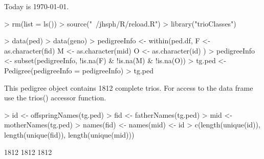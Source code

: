 \documentclass[10pt]{article}
\begin{document}
\setlength{\parskip}{0.2\baselineskip}
\setlength{\parindent}{0pt}
Today is \today.
\begin{Schunk}
\begin{Sinput}
> rm(list = ls())
> source("~/jhsph/R/reload.R")
> library("trioClasses")
\end{Sinput}
\end{Schunk}
\begin{Schunk}
\begin{Sinput}
> data(ped)
> data(geno)
> pedigreeInfo <- within(ped.df, {
     F <- as.character(fid)
     M <- as.character(mid)
     O <- as.character(id)
 })
> pedigreeInfo <- subset(pedigreeInfo, !is.na(F) & !is.na(M) & 
     !is.na(O))
> tg.ped <- Pedigree(pedigreeInfo = pedigreeInfo)
> tg.ped
\end{Sinput}
\begin{Soutput}
This pedigree object contains 1812 complete trios.
For access to the data frame use the trios() accessor function.
\end{Soutput}
\end{Schunk}
\begin{Schunk}
\begin{Sinput}
> id <- offspringNames(tg.ped)
> fid <- fatherNames(tg.ped)
> mid <- motherNames(tg.ped)
> names(fid) <- names(mid) <- id
> c(length(unique(id)), length(unique(fid)), length(unique(mid)))
\end{Sinput}
\begin{Soutput}
[1] 1812 1812 1812
\end{Soutput}
\end{Schunk}
\end{document}
